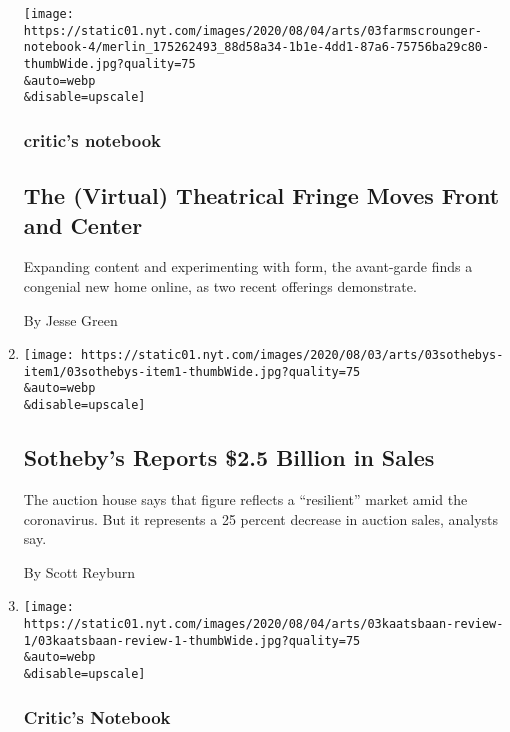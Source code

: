 \begin{enumerate}
  \texttt{[image: https://static01.nyt.com/images/2020/08/04/arts/03farmscrounger-notebook-4/merlin\_175262493\_88d58a34-1b1e-4dd1-87a6-75756ba29c80-thumbWide.jpg?quality=75\\\&auto=webp\\\&disable=upscale]}

  \hypertarget{critics-notebook-1}{%
  \subsubsection{critic's notebook}\label{critics-notebook-1}}

  \hypertarget{the-virtual-theatrical-fringe-moves-front-and-center}{%
  \subsection{The (Virtual) Theatrical Fringe Moves Front and
  Center}\label{the-virtual-theatrical-fringe-moves-front-and-center}}

  Expanding content and experimenting with form, the avant-garde finds a
  congenial new home online, as two recent offerings demonstrate.

  By Jesse Green
\item
  \href{/2020/08/03/arts/design/sothebys-sales.html}{}

  \texttt{[image: https://static01.nyt.com/images/2020/08/03/arts/03sothebys-item1/03sothebys-item1-thumbWide.jpg?quality=75\\\&auto=webp\\\&disable=upscale]}

  \hypertarget{sothebys-reports-25-billion-in-sales}{%
  \subsection{Sotheby's Reports \$2.5 Billion in
  Sales}\label{sothebys-reports-25-billion-in-sales}}

  The auction house says that figure reflects a ``resilient'' market
  amid the coronavirus. But it represents a 25 percent decrease in
  auction sales, analysts say.

  By Scott Reyburn
\item
  \href{/2020/08/03/arts/dance/kaatsbaan-dance.html}{}

  \texttt{[image: https://static01.nyt.com/images/2020/08/04/arts/03kaatsbaan-review-1/03kaatsbaan-review-1-thumbWide.jpg?quality=75\\\&auto=webp\\\&disable=upscale]}

  \hypertarget{critics-notebook-2}{%
  \subsubsection{Critic's Notebook}\label{critics-notebook-2}}


\end{enumerate}
